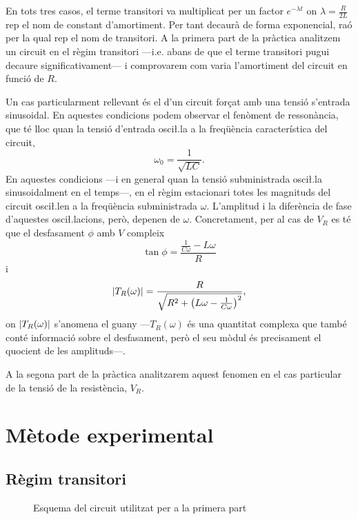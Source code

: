 En tots tres casos, el terme transitori va multiplicat per un factor \( e^{-\lambda t} \) on \( \lambda = \frac{R}{2L} \) rep el nom de constant d'amortiment. Per tant decaurà de forma exponencial, raó per la qual rep el nom de transitori. A la primera part de la pràctica analitzem un circuit en el règim transitori ---i.e. abans de que el terme transitori pugui decaure significativament--- i comprovarem com varia l'amortiment del circuit en funció de \( R \).  

Un cas particularment rellevant és el d'un circuit forçat amb una tensió s'entrada sinusoidal. En aquestes condicions podem observar el fenòment de ressonància, que té lloc quan la tensió d'entrada osci\l.la a la freqüència característica del circuit, 
\begin{equation}\label{eq:freq ressonancia}
	\omega_0 = \frac{1}{\sqrt{LC}}.
\end{equation}
En aquestes condicions ---i en general quan la tensió subministrada osci\l.la sinusoidalment en el temps---, en el règim estacionari totes les magnituds del circuit osci\l.len a la freqüència subministrada \( \omega \). L'amplitud i la diferència de fase d'aquestes osci\l.lacions, però, depenen de \( \omega \). Concretament, per al cas de \( V_R \) es té que el desfasament \( \phi \) amb \( V \) compleix
\begin{equation} \label{eq:desfasament}
	\tan{\phi} = \frac{\frac{1}{C\omega} - L\omega}{R}
\end{equation}
i 
\begin{equation} \label{eq:guany}
	\left\lvert T_R(\omega) \right\rvert = \frac{R}{\sqrt{R^2 + \left(L\omega - \frac{1}{C\omega}\right)^2}},
\end{equation}
on \( \left\lvert T_R(\omega) \right\rvert \) s'anomena el guany ---\( T_R(\omega) \) és una quantitat complexa que també conté informació sobre el desfasament, però el seu mòdul és precisament el quocient de les amplituds---.

A la segona part de la pràctica analitzarem aquest fenomen en el cas particular de la tensió de la resistència, \( V_R \).   

\section{Mètode experimental}
\subsection{Règim transitori}
\begin{figure}[htb]
	\centering \small \sffamily
	
	\caption{Esquema del circuit utilitzat per a la primera part}
	\label{fig:esquema transitori}
\end{figure}

